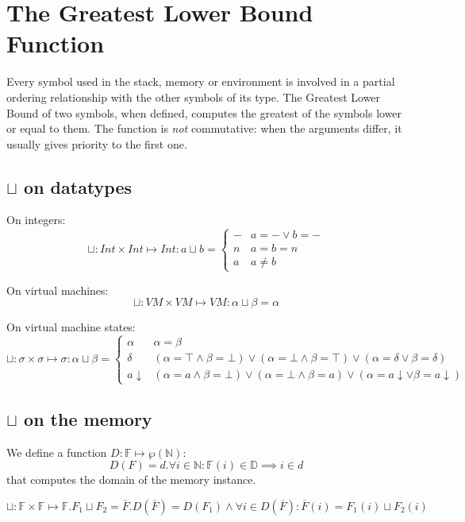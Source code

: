 \documentclass{amsart}
\newcommand{\N}{\mathbb{N}}
\newcommand{\bF}{\mathbb{F}}
\newcommand{\data}{\mathbb{D}}
\newcommand{\down}[1]{#1\downarrow}
\numberwithin{equation}{section}
\theoremstyle{plain} %
\theoremstyle{definition}
\theoremstyle{remark}
\begin{document}
\section{The Greatest Lower Bound Function}

Every symbol used in the stack, memory or environment is involved in a partial ordering relationship with the other symbols of its type. The Greatest Lower Bound of two symbols, when defined, computes the greatest of the symbols lower or equal to them. The function is \emph{not} commutative: when the arguments differ, it usually gives priority to the first one.

\subsection{$\sqcup$ on datatypes}
On integers:
\[
\sqcup: Int \times Int \mapsto Int: a \sqcup b =
\begin{cases}
- & a = - \vee b = -\\
n & a = b = n\\
a & a \neq b

\end{cases}
\]

On virtual machines:
\[
\sqcup: VM \times VM \mapsto VM: \alpha \sqcup \beta = \alpha\]

On virtual machine states:
\[
\sqcup: \sigma \times \sigma \mapsto \sigma: \alpha \sqcup \beta =
\begin{cases}
\alpha & \alpha = \beta\\
\delta & (\alpha = \top \wedge \beta = \bot) \vee (\alpha = \bot \wedge \beta = \top) \vee (\alpha = \delta \vee \beta = \delta)\\
\down{a} & (\alpha = a \wedge \beta = \bot) \vee (\alpha = \bot \wedge \beta = a) \vee (\alpha = \down{a} \vee \beta = \down{a})
\end{cases}
\]

\subsection{$\sqcup$ on the memory}
We define a function $D: \bF{} \mapsto \wp(\N{})$:\\
\[D(F) = d.\forall i \in \N{}: \bF{}(i) \in \data{} \implies i \in d\]
that computes the domain of the memory instance.

\[
\sqcup: \bF{} \times \bF{} \mapsto \bF{}. F_1 \sqcup F_2 = \overline{F}. D(\overline{F}) = D(F_1) \wedge \forall i \in D(\overline{F}): \overline{F}(i) = F_1(i) \sqcup F_2(i)
\]
\end{document}
